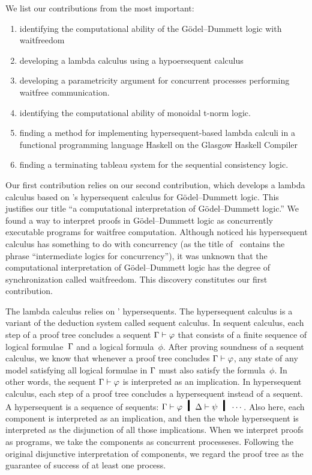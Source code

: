 We list our contributions from the most important: 
\begin{enumerate}
 \item identifying the computational ability of the
G\"odel--Dummett logic with waitfreedom
 \item developing a lambda calculus using
       a hypoersequent calculus
 \item developing a parametricity argument for
       concurrent processes performing waitfree communication.
 \item identifying the computational ability of monoidal t-norm logic.
 \item finding a method for implementing hypersequent-based lambda calculi in a
       functional programming language Haskell on the Glasgow Haskell
       Compiler
 \item finding a terminating tableau system for the sequential
       consistency logic.
\end{enumerate}

Our first contribution relies on our second contribution, which
develops a lambda calculus based on \citet{avron91}'s hypersequent
calculus for G\"odel--Dummett logic.  This justifies our title ``a
computational interpretation of G\"odel--Dummett logic.''
We found a way to interpret proofs in G\"odel--Dummett logic as
concurrently executable programs for waitfree computation.
Although \citet{avron91} noticed his hypersequent calculus has something
to do with concurrency (as the title of~\citep{avron91} contains the phrase
``intermediate logics for concurrency''), it was unknown that
the computational interpretation of G\"odel--Dummett logic has
the degree of synchronization called waitfreedom.  This discovery
constitutes our first contribution.

The lambda calculus relies on \citet{avron91}' hypersequents.
The hypersequent calculus is a
variant of the deduction system called sequent calculus.  In sequent
calculus, each step of a proof tree concludes a sequent $\Gamma\vdash\varphi$ that
consists of a finite sequence of logical formulae~$\Gamma$ and a logical
formula~$\phi$.  After proving soundness of a sequent calculus, we know
that whenever a proof tree concludes $\Gamma\vdash\varphi$, any state of any model
satisfying all logical formulae in $\Gamma$ must also satisfy the
formula~$\phi$.  In other words, the sequent $\Gamma\vdash\varphi$ is
interpreted as an implication.  In hypersequent calculus, each step of a
proof tree concludes a hypersequent instead of a sequent.  A
hypersequent is a sequence of sequents: $\G\vdash\phi\hmid \D\vdash\psi
\hmid \cdots$.  Also here, each component is interpreted as an
implication, and then the whole hypersequent is interpreted as the
disjunction of all those implications.
When we interpret proofs as programs, we take the components as
concurrent processeses.  Following the original disjunctive
interpretation of components, we regard the proof tree as the guarantee of
success of at least one process.

